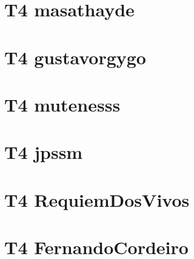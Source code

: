 

\chapter{T4 masathayde}



\chapter{T4 gustavorgygo}



\chapter{T4 mutenesss}



\chapter{T4 jpssm}

%

\chapter{T4 RequiemDosVivos}

%

\chapter{T4 FernandoCordeiro}



